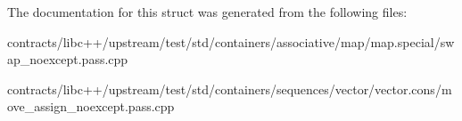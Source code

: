 The documentation for this struct was generated from the following files\+:\begin{DoxyCompactItemize}
\item 
contracts/libc++/upstream/test/std/containers/associative/map/map.\+special/swap\+\_\+noexcept.\+pass.\+cpp\item 
contracts/libc++/upstream/test/std/containers/sequences/vector/vector.\+cons/move\+\_\+assign\+\_\+noexcept.\+pass.\+cpp\end{DoxyCompactItemize}
